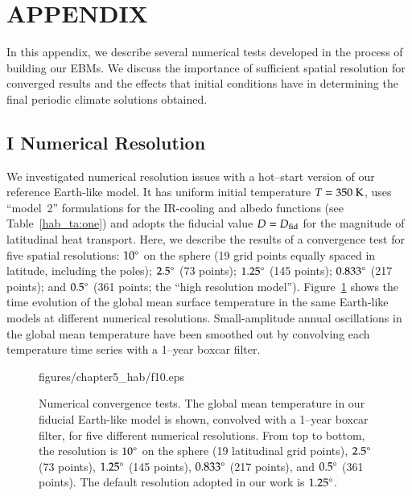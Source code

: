 \section*{APPENDIX}
\label{hab_sec:appendix}
In this appendix, we describe several numerical tests developed in the
process of building our EBMs.  We discuss the importance of sufficient
spatial resolution for converged results and the effects that initial
conditions have in determining the final periodic climate solutions
obtained.

\subsection*{I Numerical Resolution}
\label{hab_sec:res}

We investigated numerical resolution issues with a hot--start version
of our reference Earth-like model. It has uniform initial temperature
$T=350 {\rm~K}$, uses ``model~2'' formulations for the IR-cooling and
albedo functions (see Table~\ref{hab_ta:one}) and adopts the fiducial
value $D=D_{\rm fid}$ for the magnitude of latitudinal heat
transport. Here, we describe the results of a convergence test for
five spatial resolutions: $10\mbox{$^\circ$}$ on the sphere (19 grid points
equally spaced in latitude, including the poles); $2.5\mbox{$^\circ$}$ (73
points); $1.25\mbox{$^\circ$}$ (145 points); $0.833\mbox{$^\circ$}$ (217 points); and
$0.5\mbox{$^\circ$}$ (361 points; the ``high resolution model'').
Figure~\ref{hab_fig:res comp} shows the time evolution of the global mean
surface temperature in the same Earth-like models at different
numerical resolutions.  Small-amplitude annual oscillations in the
global mean temperature have been smoothed out by convolving each
temperature time series with a 1--year boxcar filter.
\begin{figure}[p]
\plotone
{figures/chapter5_hab/f10.eps}
\caption[Numerical convergence tests.]{Numerical convergence tests.
The global mean temperature in our fiducial Earth-like model is shown,
convolved with a 1--year boxcar filter, for five different numerical
resolutions. From top to bottom, the resolution is $10\mbox{$^\circ$}$ on the
sphere (19 latitudinal grid points), $2.5\mbox{$^\circ$}$ (73 points),
$1.25\mbox{$^\circ$}$ (145 points), $0.833\mbox{$^\circ$}$ (217 points), and $0.5\mbox{$^\circ$}$
(361 points). The default resolution adopted in our work is
$1.25\mbox{$^\circ$}$.}
\label{hab_fig:res comp}
\end{figure}
\afterpage{\clearpage}

